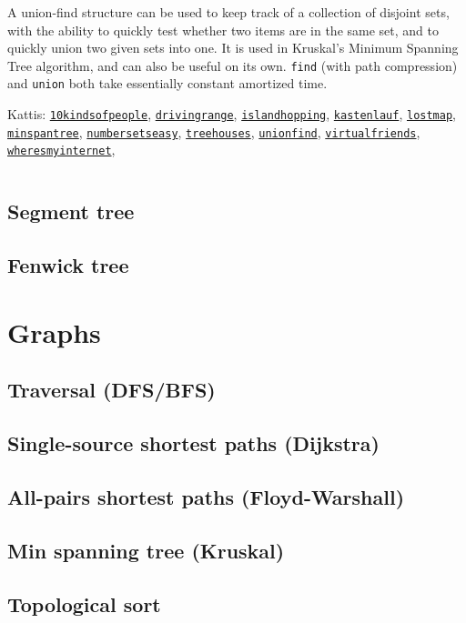 \documentclass[10pt]{article}
\newcommand{\code}[1]{\inputminted[fontsize=\normalsize]{java}{code/#1}}
\newcommand{\kattis}[1]{\href{https://open.kattis.com/problems/#1}{\texttt{#1}}}
\begin{document}
A union-find structure can be used to keep track of a collection of
disjoint sets, with the ability to quickly test whether two items are
in the same set, and to quickly union two given sets into one.  It is
used in Kruskal's Minimum Spanning Tree algorithm, and can also be
useful on its own.  \texttt{find} (with path compression) and
\texttt{union} both take essentially constant amortized
time.

Kattis: \kattis{10kindsofpeople}, \kattis{drivingrange},
\kattis{islandhopping}, \kattis{kastenlauf}, \kattis{lostmap},
\kattis{minspantree}, \kattis{numbersetseasy}, \kattis{treehouses},
\kattis{unionfind}, \kattis{virtualfriends},
\kattis{wheresmyinternet},

\code{data-structures/UnionFind.java}

\subsection{Segment tree}

\subsection{Fenwick tree}


\section{Graphs}

\subsection{Traversal (DFS/BFS)}

\subsection{Single-source shortest paths (Dijkstra)}

\subsection{All-pairs shortest paths (Floyd-Warshall)}

\subsection{Min spanning tree (Kruskal)} \label{sec:kruskal}

\subsection{Topological sort}
\end{document}
